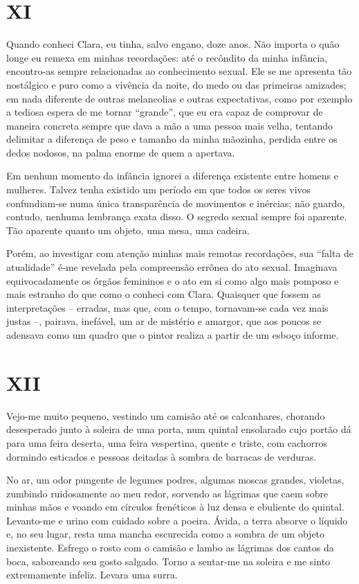 \chapter*{\centering\Large{XI}}

Quando conheci Clara, eu tinha, salvo engano, doze anos. Não importa o quão longe eu remexa em minhas recordações: até o recôndito da minha infância, encontro-as sempre relacionadas ao conhecimento sexual. Ele se me apresenta tão nostálgico e puro como a vivência da noite, do medo ou das primeiras amizades; em nada diferente de outras melancolias e outras expectativas, como por exemplo a tediosa espera de me tornar ``grande'', que eu era capaz de comprovar de maneira concreta sempre que dava a mão a uma pessoa mais velha, tentando delimitar a diferença de peso e tamanho da minha mãozinha, perdida entre os dedos nodosos, na palma enorme de quem a apertava.

Em nenhum momento da infância ignorei a diferença existente entre homens e mulheres. Talvez tenha existido um período em que todos os seres vivos confundiam-se numa única transparência de movimentos e inércias; não guardo, contudo, nenhuma lembrança exata disso. O segredo sexual sempre foi aparente. Tão aparente quanto um objeto, uma mesa, uma cadeira.

Porém, ao investigar com atenção minhas mais remotas recordações, sua ``falta de atualidade'' é-me revelada pela compreensão errônea do ato sexual. Imaginava equivocadamente os órgãos femininos e o ato em si como algo mais pomposo e mais estranho do que como o conheci com Clara. Quaisquer que fossem as interpretações -- erradas, mas que, com o tempo, tornavam-se cada vez mais justas --, pairava, inefável, um ar de mistério e amargor, que aos poucos se adensava como um quadro que o pintor realiza a partir de um esboço informe.


\chapter*{\centering\Large{XII}}

Vejo-me muito pequeno, vestindo um camisão até os calcanhares, chorando desesperado junto à soleira de uma porta, num quintal ensolarado cujo portão dá para uma feira deserta, uma feira vespertina, quente e triste, com cachorros dormindo esticados e pessoas deitadas à sombra de barracas de verduras.

No ar, um odor pungente de legumes podres, algumas moscas grandes, violetas, zumbindo ruidosamente ao meu redor, sorvendo as lágrimas que caem sobre minhas mãos e voando em círculos frenéticos à luz densa e ebuliente do quintal. Levanto-me e urino com cuidado sobre a poeira. Ávida, a terra absorve o líquido e, no seu lugar, resta uma mancha escurecida como a sombra de um objeto inexistente. Esfrego o rosto com o camisão e lambo as lágrimas dos cantos da boca, saboreando seu gosto salgado. Torno a sentar-me na soleira e me sinto extremamente infeliz. Levara uma surra.

